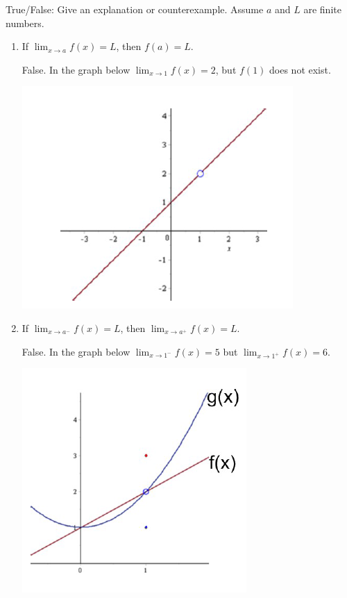 \documentclass[nooutcomes]{ximera}
\begin{document}
\begin{problem}
True/False:  Give an explanation or counterexample.  Assume $a$ and $L$ are finite numbers.
	
			\begin{enumerate}

			\item  If $ \lim_{x \to a} f(x) = L$, then $f(a) = L$.
			\begin{freeResponse}
			False.  In the graph below $ \lim_{x \to 1} f(x) = 2 $, but $f(1)$ does not exist.
				\begin{image}
				      \includegraphics[trim= 70 470 250 160]{Figure1}
				\end{image}
			\end{freeResponse}
			
			\item  If $  \lim_{x \to a^-} f(x) = L$, then $  \lim_{x \to a^+} f(x) = L $.
			\begin{freeResponse}
			False.  In the graph below $ \lim_{x \to 1^-} f(x) = 5$ but $ \lim_{x \to 1^+} f(x) = 6$.
			
				\begin{image}
						      \includegraphics[trim= 70 470 250 160]{Figure3}		
				\end{image}
			\end{freeResponse}
			

\end{enumerate}
\end{problem}
\end{document}

